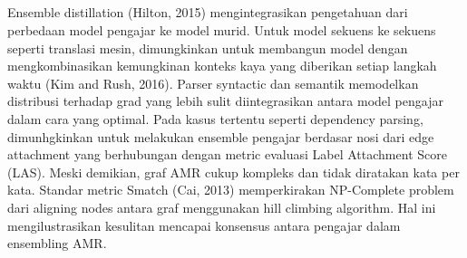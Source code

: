\subsection{ }

Ensemble distillation (Hilton, 2015) mengintegrasikan pengetahuan dari perbedaan model pengajar ke model murid.
Untuk model sekuens ke sekuens seperti translasi mesin, dimungkinkan untuk membangun model dengan mengkombinasikan kemungkinan konteks kaya yang diberikan setiap langkah waktu (Kim and Rush, 2016).
Parser syntactic dan semantik memodelkan distribusi terhadap grad yang lebih sulit diintegrasikan antara model pengajar dalam cara yang optimal.
Pada kasus tertentu seperti dependency parsing, dimunhgkinkan untuk melakukan ensemble pengajar berdasar nosi dari edge attachment yang berhubungan dengan metric evaluasi Label Attachment Score (LAS).
Meski demikian, graf AMR cukup kompleks dan tidak diratakan kata per kata.
Standar metric Smatch (Cai, 2013) memperkirakan NP-Complete problem dari aligning nodes antara graf menggunakan hill climbing algorithm.
Hal ini mengilustrasikan kesulitan mencapai konsensus antara pengajar dalam ensembling AMR.

